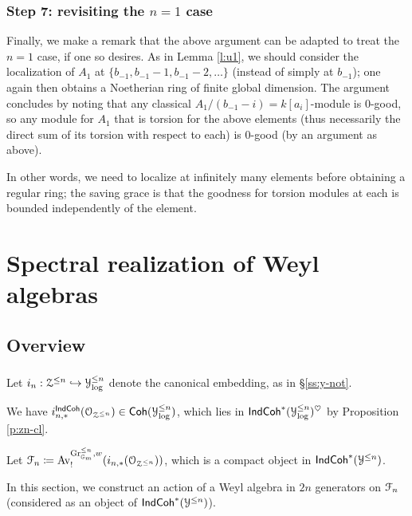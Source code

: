 \documentclass[reqno,11pt]{amsart}
\numberwithin{equation}{subsection}
\theoremstyle{remark}
\newcommand{\into}{\hookrightarrow}
\newcommand{\bG}{{\mathbb G}}
\newcommand{\sF}{{\EuScript F}}
\newcommand{\sO}{{\EuScript O}}
\newcommand{\sY}{{\EuScript Y}}
\newcommand{\sZ}{{\EuScript Z}}
\newcommand{\on}{\operatorname}
\newcommand{\Gr}{\on{Gr}}
\newcommand{\heart}{\heartsuit}
\newcommand{\Av}{\on{Av}}
\newcommand{\Coh}{\mathsf{Coh}}
\newcommand{\IndCoh}{\mathsf{IndCoh}}
\begin{document}
\subsubsection{Step 7: revisiting the $n = 1$ case}\label{sss:semi-coh-7}

Finally, we make a remark that the above argument can be adapted to 
treat the $n = 1$ case, if one so desires. As in Lemma \ref{l:u1}, 
we should consider the localization of 
$A_1$ at $\{b_{-1},b_{-1}-1,b_{-1}-2,\ldots\}$
(instead of simply at $b_{-1}$); one again then obtains a Noetherian ring
of finite global dimension. The argument concludes by noting that 
any classical $A_1/(b_{-1}-i) = k[a_i]$-module is $0$-good, so 
any module for $A_1$ that is torsion for the above elements (thus
necessarily the direct sum of its torsion with respect to each) is
$0$-good (by an argument as above).

In other words, we need to localize at infinitely many elements before
obtaining a regular ring; the saving
grace is that the goodness for torsion modules at each is bounded independently
of the element.

\section{Spectral realization of Weyl algebras}\label{s:weyl}

\subsection{Overview}

\subsubsection{}

Let $i_n:\sZ^{\leq n} \into \sY_{\log}^{\leq n}$ denote the 
canonical embedding, as in \S \ref{ss:y-not}.

We have $i_{n,*}^{\IndCoh}(\sO_{\sZ^{\leq n}}) \in \Coh(\sY_{\log}^{\leq n})$,
which lies in $\IndCoh^*(\sY_{\log}^{\leq n})^{\heart}$ by
Proposition \ref{p:zn-cl}.

Let $\sF_n \coloneqq 
\Av_!^{\Gr_{\bG_m}^{\leq n},w}
(i_{n,*}(\sO_{\sZ^{\leq n}}))$, which is a compact object in $\IndCoh^*(\sY^{\leq n})$.

In this section, we construct an action of 
a Weyl algebra in $2n$ generators on $\sF_n$ (considered as an object of 
$\IndCoh^*(\sY^{\leq n})$).

\subsubsection{}
\end{document}
